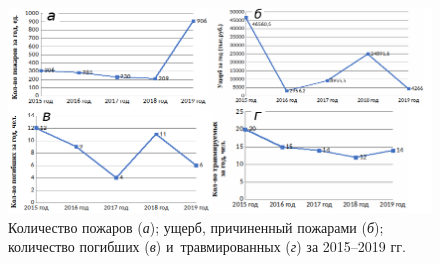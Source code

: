 \begin{figure}[H]
  \begin{center}
    \includegraphics[width=1\textwidth]{authors/zelencov_fig1.png}
  \end{center}
  \caption{Количество пожаров (\textit{а}); ущерб, причиненный пожарами (\textit{б}); количество погибших (\textit{в}) и~травмированных (\textit{г}) за 2015--2019 гг.}
  \label{fig:zelencov-fig1}
\end{figure}
